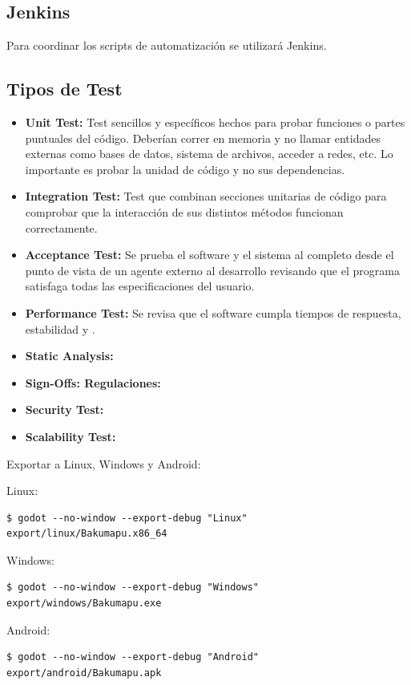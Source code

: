 \subsection{Jenkins}

Para coordinar los scripts de automatización se utilizará Jenkins.


\subsection{Tipos de Test}\label{pipeline:tipos-de-test}

\begin{itemize}
  \item \textbf{Unit Test:} Test sencillos y específicos hechos para probar funciones o partes puntuales del código. Deberían correr en memoria y no llamar entidades externas como bases de datos, sistema de archivos, acceder a redes, etc. Lo importante es probar la unidad de código y no sus dependencias.
  \item \textbf{Integration Test:} Test que combinan secciones unitarias de código para comprobar que la interacción de sus distintos métodos funcionan correctamente.
  \item \textbf{Acceptance Test:} Se prueba el software y el sistema al completo desde el punto de vista de un agente externo al desarrollo revisando que el programa satisfaga todas las especificaciones del usuario.
  \item \textbf{Performance Test:} Se revisa que el software cumpla tiempos de respuesta, estabilidad y .
  \item \textbf{Static Analysis:} 
  \item \textbf{Sign-Offs: Regulaciones:} 
  \item \textbf{Security Test:} 
  \item \textbf{Scalability Test:} 
\end{itemize}

Exportar a Linux, Windows y Android:

Linux:
\begin{lstlisting}
$ godot --no-window --export-debug "Linux" export/linux/Bakumapu.x86_64
\end{lstlisting}

Windows:
\begin{lstlisting}
$ godot --no-window --export-debug "Windows" export/windows/Bakumapu.exe
\end{lstlisting}

Android:
\begin{lstlisting}
$ godot --no-window --export-debug "Android" export/android/Bakumapu.apk
\end{lstlisting}
